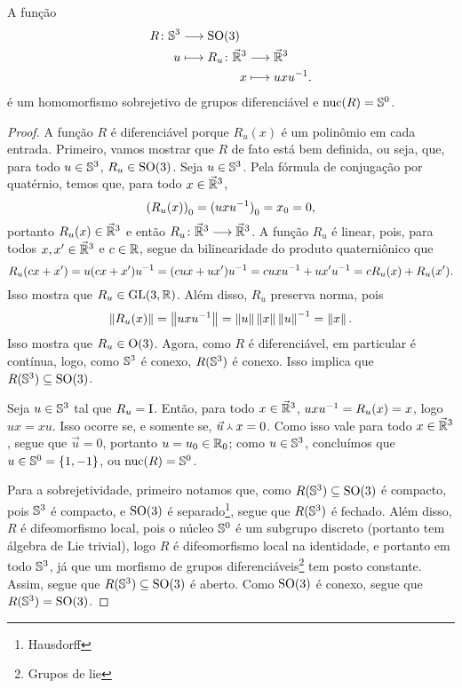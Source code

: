 \begin{proposition}
A função
	\begin{align*}
	\func{R}{\S^3}{\SO(3)}{u}{
		\begin{aligned}[t]
		\func{R_u}{\vec{\R}^3}{\vec{\R}^3}{x}{uxu\inv}.
		\end{aligned}
	}
	\end{align*}
é um homomorfismo sobrejetivo de grupos diferenciável e $\nuc(R)=\S^0$.
\end{proposition}
\begin{proof}
A função $R$ é diferenciável porque $R_u(x)$ é um polinômio em cada entrada. Primeiro, vamos mostrar que $R$ de fato está bem definida, ou seja, que, para todo $u \in \S^3$, $R_u \in \SO(3)$. Seja $u \in \S^3$. Pela fórmula de conjugação por quatérnio, temos que, para todo $x \in \vec{\R}^3$,
	\begin{equation*}
	\esc{(R_u(x))} = \esc{(uxu\inv)} = \esc{x} = 0,
	\end{equation*}
portanto $R_u(x) \in \vec{\R}^3$ e então $\fun{R_u}{\vec{\R}^3}{\vec{\R}^3}$. A função $R_u$ é linear, pois, para todos $x,x' \in \vec{\R}^3$ e $c \in \R$, segue da bilinearidade do produto quaterniônico que
	\begin{equation*}
	R_u(cx+x') = u(cx+x')u\inv = (cux+ux')u\inv = cuxu\inv + ux'u\inv = cR_u(x) + R_u(x').
	\end{equation*}
Isso mostra que $R_u \in \GL(3,\R)$. Além disso, $R_u$ preserva norma, pois
	\begin{equation*}
	\nor{R_u(x)} = \nor{uxu\inv} = \nor{u}\nor{x}\nor{u}\inv = \nor{x}.
	\end{equation*}
Isso mostra que $R_u \in \OO(3)$. Agora, como $R$ é diferenciável, em particular é contínua, logo, como $\S^3$ é conexo, $R(\S^3)$ é conexo. Isso implica que $R(\S^3) \subseteq \SO(3)$.

Seja $u \in \S^3$ tal que $R_u=\Id$. Então, para todo $x \in \vec{\R}^3$, $uxu\inv = R_u(x) = x$, logo $ux=xu$. Isso ocorre se, e somente se, $\pvec{\vec{u}}{x} = 0$. Como isso vale para todo $x \in \vec{\R}^3$, segue que $\vec{u}=0$, portanto $u=\esc{u} \in \esc{\R}$; como $u \in \S^3$, concluímos que $u \in \S^0 = \{1,-1\}$, ou $\nuc(R) = \S^0$.

Para a sobrejetividade, primeiro notamos que, como $R(\S^3) \subseteq \SO(3)$ é compacto, pois $\S^3$ é compacto, e $\SO(3)$ é separado\footnote{Hausdorff}, segue que $R(\S^3)$ é fechado. Além disso, $R$ é difeomorfismo local, pois o núcleo $\S^0$ é um subgrupo discreto (portanto tem álgebra de Lie trivial), logo $R$ é difeomorfismo local na identidade, e portanto em todo $\S^3$, já que um morfismo de grupos diferenciáveis\footnote{Grupos de lie} tem posto constante. Assim, segue que $R(\S^3) \subseteq \SO(3)$ é aberto. Como $\SO(3)$ é conexo, segue que $R(\S^3) = \SO(3)$.
\end{proof}

